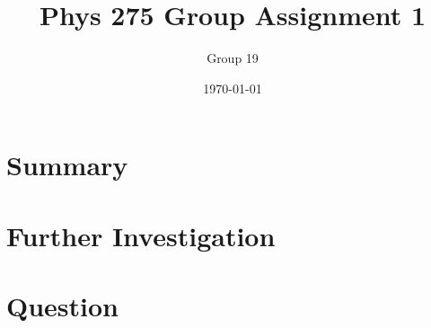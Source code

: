 \documentclass[10pt]{article}
\begin{document}
	\title{\textbf{Phys 275 Group Assignment 1}}
	\date{\today}
	\author{Group 19}
	\maketitle
	
	\newpage
	\section{Summary}
	
	\newpage
	\section{Further Investigation}
	
	\newpage
	\section{Question}
	
	\newpage
\end{document}

